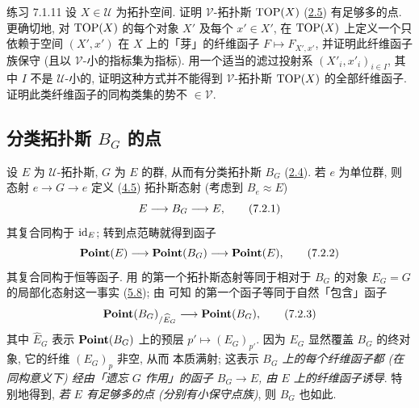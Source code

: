\begin{enonce*}[remark]{练习 7.1.11}
设 $X\in 𝒰$ 为拓扑空间. 证明 $𝒱$-拓扑斯 $\operatorname{TOP}(X)$ (\hyperref[IV.subsec2.5]{2.5}) 有足够多的点. 更确切地, 对 $\operatorname{TOP}(X)$ 的每个对象 $X'$ 及每个 $x'\in X'$, 在 $\operatorname{TOP}(X)$ 上定义一个只依赖于空间 $(X',x')$ 在 $X$ 上的「芽」的纤维函子 $F\mapsto F_{X',x'}$, 并证明此纤维函子族保守 (且以 $𝒱$-小的指标集为指标). 用一个适当的滤过投射系 $(X'_i,x'_i)_{i\in I}$, 其中 $I$ 不是 $𝒰$-小的, 证明这种方式并不能得到 $𝒱$-拓扑斯 $\operatorname{TOP}(X)$ 的全部纤维函子. 证明此类纤维函子的同构类集的势不 $\in 𝒱$.
\end{enonce*}

\subsection{分类拓扑斯 $B_G$ 的点}\pageoriginale

设 $E$ 为 $𝒰$-拓扑斯, $G$ 为 $E$ 的群, 从而有分类拓扑斯 $B_G$ (\hyperref[IV.subsec2.4]{2.4}). 若 $e$ 为单位群, 则态射 $e\rightarrow G\rightarrow e$ 定义 (\hyperref[IV.subsec4.5]{4.5}) 拓扑斯态射 (考虑到 $B_e\approx E$)
\begin{equation*}
E\longrightarrow B_G \longrightarrow E{},\tag{7.2.1}
\end{equation*}
其复合同构于 $\operatorname{id}_E$; 转到点范畴就得到函子
\begin{equation*}
\operatorname{\mathbf{Point}}(E)\longrightarrow \operatorname{\mathbf{Point}}(B_G)\longrightarrow
\operatorname{\mathbf{Point}}(E){},\tag{7.2.2}
\end{equation*}
其复合同构于恒等函子. 用  的第一个拓扑斯态射等同于相对于 $B_G$ 的对象 $E_G=G$ 的局部化态射这一事实 (\hyperref[IV.subsec5.8]{5.8}); 由  可知  的第一个函子等同于自然「包含」函子
\begin{equation*}
\operatorname{\mathbf{Point}}(B_G)_{/\widehat{E}_G}\longrightarrow
\operatorname{\mathbf{Point}}(B_G){},\tag{7.2.3}
\end{equation*}
其中 $\widehat{E}_G$ 表示 $\operatorname{\mathbf{Point}}(B_G)$ 上的预层 $p'\mapsto (E_G)_{p'}$. 因为 $E_G$ 显然覆盖 $B_G$ 的终对象, 它的纤维 $(E_G)_p$ 非空, 从而  本质满射; 这表示 \emph{$B_G$ 上的每个纤维函子都 (在同构意义下) 经由「遗忘 $G$ 作用」的函子 $B_G\rightarrow E$, 由 $E$ 上的纤维函子诱导}. 特别地得到, \emph{若 $E$ 有足够多的点 (分别有小保守点族)}, 则 $B_G$ 也如此.

